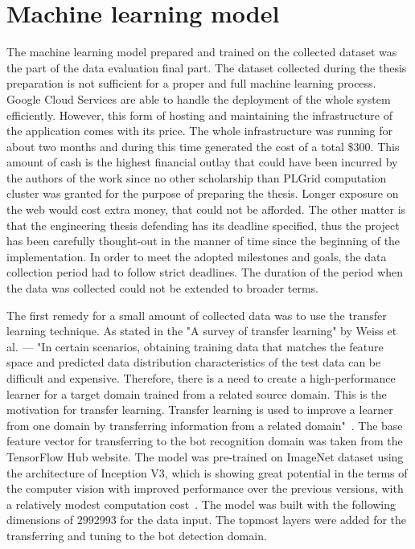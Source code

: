 \section{Machine learning model}\label{sec:machine-learning-model}
The machine learning model prepared and trained on the collected dataset was the part of the data evaluation final part.
The dataset collected during the thesis preparation is not sufficient for a proper and full machine learning process.
Google Cloud Services are able to handle the deployment of the whole system efficiently.
However, this form of hosting and maintaining the infrastructure of the application comes with its price.
The whole infrastructure was running for about two months and during this time generated the cost of a total \$300.
This amount of cash is the highest financial outlay that could have been incurred by the authors of the work since no other scholarship than PLGrid computation cluster was granted for the purpose of preparing the thesis.
Longer exposure on the web would cost extra money, that could not be afforded.
The other matter is that the engineering thesis defending has its deadline specified, thus the project has been carefully thought-out in the manner of time since the beginning of the implementation.
In order to meet the adopted milestones and goals, the data collection period had to follow strict deadlines.
The duration of the period when the data was collected could not be extended to broader terms.

The first remedy for a small amount of collected data was to use the transfer learning technique.
As stated in the "A survey of transfer learning" by Weiss et al. --- "In certain scenarios, obtaining training data that matches the feature space and predicted data distribution characteristics of the test data can be difficult and expensive.
Therefore, there is a need to create a high-performance learner for a target domain trained from a related source domain.
This is the motivation for transfer learning.
Transfer learning is used to improve a learner from one domain by transferring information from a related domain"~\cite{transfer-learning-def}.
The base feature vector for transferring to the bot recognition domain was taken from the TensorFlow Hub website.
The model was pre-trained on ImageNet dataset using the architecture of Inception V3, which is showing great potential in the terms of the computer vision with improved performance over the previous versions, with a relatively modest computation cost~\cite{inception-v3}.
The model was built with the following dimensions of $299$\texttimes$299$\texttimes$3$ for the data input.
The topmost layers were added for the transferring and tuning to the bot detection domain.

